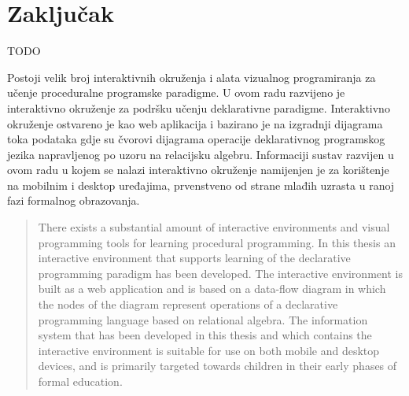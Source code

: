 \documentclass[times, utf8, diplomski, numeric]{fer}
\begin{document}
\chapter{Zaključak}

TODO







\begin{sazetak}
Postoji velik broj interaktivnih okruženja i alata vizualnog programiranja za učenje proceduralne programske paradigme.
U ovom radu razvijeno je interaktivno okruženje za podršku učenju deklarativne paradigme.
Interaktivno okruženje ostvareno je kao web aplikacija i bazirano je na izgradnji dijagrama toka podataka gdje su čvorovi dijagrama operacije deklarativnog programskog jezika napravljenog po uzoru na relacijsku algebru.
Informaciji sustav razvijen u ovom radu u kojem se nalazi interaktivno okruženje namijenjen je za korištenje na mobilnim i desktop uređajima, prvenstveno od strane mlađih uzrasta u ranoj fazi formalnog obrazovanja.


\end{sazetak}

\begin{abstract}
There exists a substantial amount of interactive environments and visual programming tools for learning procedural programming.
In this thesis an interactive environment that supports learning of the declarative programming paradigm has been developed.
The interactive environment is built as a web application and is based on a data-flow diagram in which the nodes of the diagram represent operations of a declarative programming language based on relational algebra.
The information system that has been developed in this thesis and which contains the interactive environment is suitable for use on both mobile and desktop devices, and is primarily targeted towards children in their early phases of formal education.

\end{abstract}
\end{document}
